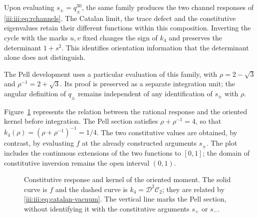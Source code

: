 Upon evaluating $s_\pm=q_\pm^{30}$, the same family produces the two channel
responses of \eqref{iii:iii:eq:rchannels}. The Catalan limit, the trace
defect and the constitutive eigenvalues retain their different functions
within this composition. Inverting the cycle with the marks $u,v$
fixed changes the sign of $k_4$ and preserves the determinant $1+s^2$.
This identifies orientation information that the determinant
alone does not distinguish.

The Pell development uses a particular evaluation of this family,
with $\rho=2-\sqrt3$ and $\rho^{-1}=2+\sqrt3$. Its proof is preserved as
a separate integration unit; the angular definition of $q_\pm$ remains
independent of any identification of $s_\pm$ with $\rho$.

Figure~\ref{iii:iii:fig:respuesta-momento-pell} represents the relation between
the rational response and the oriented kernel before integration. The Pell
section satisfies $\rho+\rho^{-1}=4$, so that
$k_4(\rho)=(\rho+\rho^{-1})^{-1}=1/4$. The two constitutive values
are obtained, by contrast, by evaluating $f$ at the already constructed
arguments $s_\pm$. The plot includes the continuous extensions of the two
functions to $[0,1]$; the domain of constitutive inversion remains
the open interval $(0,1)$.

\begin{figure}[htbp]
\centering
{}
\caption{Constitutive response and kernel of the oriented moment. The solid
curve is $f$ and the dashed curve is
$k_4=\mathcal D^2\mathcal C_2$; they are related by
\eqref{iii:iii:eq:catalan-vacuum}. The vertical line marks the Pell section,
without identifying it with the constitutive arguments $s_+$ or $s_-$.}
\label{iii:iii:fig:respuesta-momento-pell}
\end{figure}
